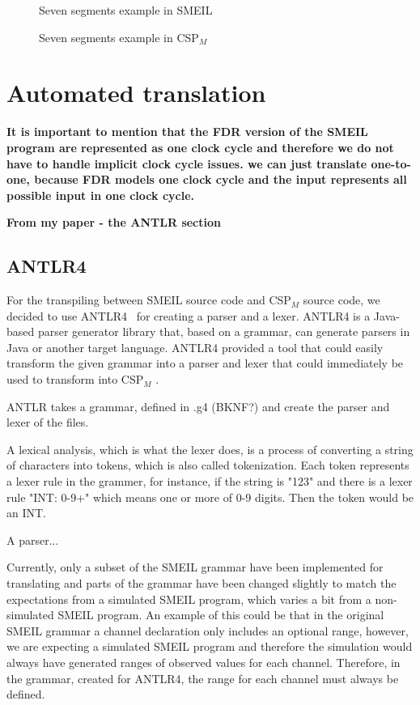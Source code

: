 \documentclass[a4paper]{report}
\newcommand{\cspm}{CSP$_M$ }
\begin{document}
\begin{figure}
\label{seven_segments_exaple.sme}
\caption{Seven segments example in SMEIL}
\end{figure}


\begin{figure}
\label{seven_segments_exaple.csp}
\caption{Seven segments example in \cspm}
\end{figure}


\section{Automated translation}
 \textbf{It is important to mention that the FDR version of the SMEIL program are represented as one clock cycle and therefore we do not have to handle implicit clock cycle issues. we can just translate one-to-one, because FDR models one clock cycle and the input represents all possible input in one clock cycle.}

 \textbf{From my paper - the ANTLR section}
\subsection{ANTLR4}
For the transpiling between SMEIL source code and \cspm{} source code, we decided to use ANTLR4~\cite{antlr} for creating a parser and a lexer. ANTLR4 is a Java-based parser generator library that, based on a grammar, can generate parsers in Java or another target language. ANTLR4 provided a tool that could easily transform the given grammar into a parser and lexer that could immediately be used to transform into \cspm{}.

ANTLR takes a grammar, defined in .g4 (BKNF?) and create the parser and lexer of the files.

A lexical analysis, which is what the lexer does, is a process of converting a string of characters into tokens, which is also called tokenization. Each token represents a lexer rule in the grammer, for instance, if the string is "123" and there is a lexer rule "INT: {0-9}+" which means one or more of 0-9 digits. Then the token would be an INT.

A parser...

Currently, only a subset of the SMEIL grammar have been implemented for translating and parts of the grammar have been changed slightly to match the expectations from a simulated SMEIL program, which varies a bit from a non-simulated SMEIL program. An example of this could be that in the original SMEIL grammar a channel declaration only includes an optional range, however, we are expecting a simulated SMEIL program and therefore the simulation would always have generated ranges of observed values for each channel. Therefore, in the grammar, created for ANTLR4, the range for each channel must always be defined.
\end{document}
